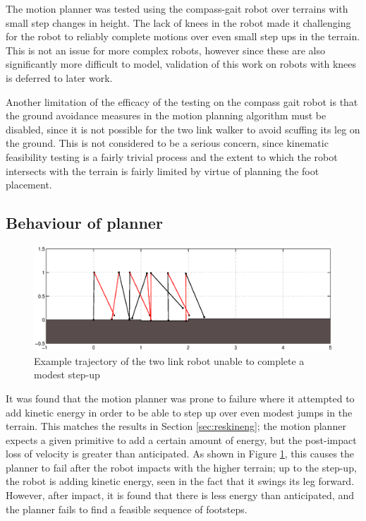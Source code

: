 The motion planner was tested using the compass-gait robot over terrains with small step changes in height. The lack of knees in the robot made it challenging for the robot to reliably complete motions over even small step ups in the terrain. This is not an issue for more complex robots, however since these are also significantly more difficult to model, validation of this work on robots with knees is deferred to later work.

Another limitation of the efficacy of the testing on the compass gait robot is that the ground avoidance measures in the motion planning algorithm must be disabled, since it is not possible for the two link walker to avoid scuffing its leg on the ground. This is not considered to be a serious concern, since kinematic feasibility testing is a fairly trivial process and the extent to which the robot intersects with the terrain is fairly limited by virtue of planning the foot placement.

\subsection{Behaviour of planner}
\begin{figure}
\centering
\includegraphics[width=\linewidth]{7Results/stepupfault}
\caption{Example trajectory of the two link robot unable to complete a modest step-up}
\label{fig:stepupfault}
\end{figure}

It was found that the motion planner was prone to failure where it attempted to add kinetic energy in order to be able to step up over even modest jumps in the terrain. This matches the results in Section \ref{sec:reskineng}; the motion planner expects a given primitive to add a certain amount of energy, but the post-impact loss of velocity is greater than anticipated. As shown in Figure \ref{fig:stepupfault}, this causes the planner to fail after the robot impacts with the higher terrain; up to the step-up, the robot is adding kinetic energy, seen in the fact that it swings its leg forward. However, after impact, it is found that there is less energy than anticipated, and the planner fails to find a feasible sequence of footsteps.

